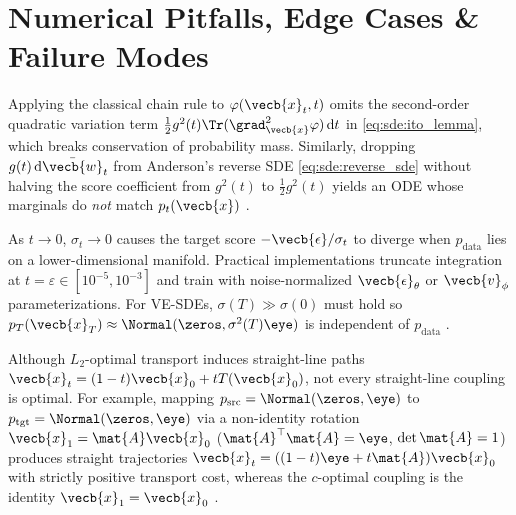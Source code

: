 \documentclass[../../../../master.tex]{subfiles}
\begin{document}
\section{Numerical Pitfalls, Edge Cases \& Failure Modes}\label{sec:sde:pitfalls}

\begin{pitfall}
Applying the classical chain rule to $\varphi(\vecb{x}_t, t)$ omits the second-order quadratic variation term $\frac{1}{2}g^2(t)\Tr(\grad_{\vecb{x}}^2\varphi)\,\mathrm{d}t$ in \eqref{eq:sde:ito_lemma}, which breaks conservation of probability mass. Similarly, dropping $g(t)\,\mathrm{d}\bar{\vecb{w}}_t$ from Anderson's reverse SDE \eqref{eq:sde:reverse_sde} without halving the score coefficient from $g^2(t)$ to $\frac{1}{2}g^2(t)$ yields an ODE whose marginals do \emph{not} match $p_t(\vecb{x})$ .
\end{pitfall}

\begin{pitfall}
As $t \to 0$, $\sigma_t \to 0$ causes the target score $-\vecb{\epsilon}/\sigma_t$ to diverge when $p_{\mathrm{data}}$ lies on a lower-dimensional manifold. Practical implementations truncate integration at $t = \varepsilon \in [10^{-5}, 10^{-3}]$ and train with noise-normalized $\vecb{\epsilon}_\theta$ or $\vecb{v}_\phi$ parameterizations. For VE-SDEs, $\sigma(T) \gg \sigma(0)$ must hold so $p_T(\vecb{x}_T) \approx \Normal(\zeros, \sigma^2(T)\eye)$ is independent of $p_{\mathrm{data}}$ .
\end{pitfall}

\begin{pitfall}
Although $L_2$-optimal transport induces straight-line paths $\vecb{x}_t = (1-t)\vecb{x}_0 + tT(\vecb{x}_0)$, not every straight-line coupling is optimal. For example, mapping $p_{\mathrm{src}} = \Normal(\zeros, \eye)$ to $p_{\mathrm{tgt}} = \Normal(\zeros, \eye)$ via a non-identity rotation $\vecb{x}_1 = \mat{A}\vecb{x}_0$ ($\mat{A}^\top\mat{A} = \eye$, $\det\mat{A} = 1$) produces straight trajectories $\vecb{x}_t = ((1-t)\eye + t\mat{A})\vecb{x}_0$ with strictly positive transport cost, whereas the $c$-optimal coupling is the identity $\vecb{x}_1 = \vecb{x}_0$ .
\end{pitfall}
\end{document}

